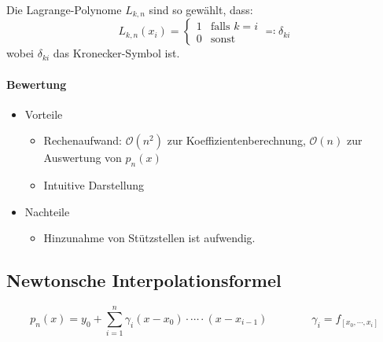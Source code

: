             Die Lagrange-Polynome \( L_{k,n} \) sind so gewählt, dass:
            \begin{equation*}
	            L_{k,n}(x_i) =
		            \begin{cases}
			            1 & \text{falls } k = i \\
			            0 & \text{sonst}
		            \end{cases}
		       \eqqcolon \delta_{ki}
            \end{equation*}
            wobei \( \delta_{ki} \) das Kronecker-Symbol ist.
            
            \paragraph{Bewertung}
	            \begin{itemize}
	            	\item Vorteile
		            	\begin{itemize}
		            		\item Rechenaufwand: \( \mathcal{O}(n^2) \) zur Koeffizientenberechnung, \( \mathcal{O}(n) \) zur Auswertung von \( p_n(x) \)
		            		\item Intuitive Darstellung
		            	\end{itemize}
	            	\item Nachteile
		            	\begin{itemize}
		            		\item Hinzunahme von Stützstellen ist aufwendig.
		            	\end{itemize}
	            \end{itemize}

        \subsection{Newtonsche Interpolationsformel}
            \begin{equation*}
	            p_n(x) = y_0 + \sum_{i=1}^n \gamma_i (x - x_0) \cdot \cdots \cdot (x - x_{i-1}) \qquad\qquad \gamma_i = f_{[x_0, \cdots, x_i]}
            \end{equation*}
            
